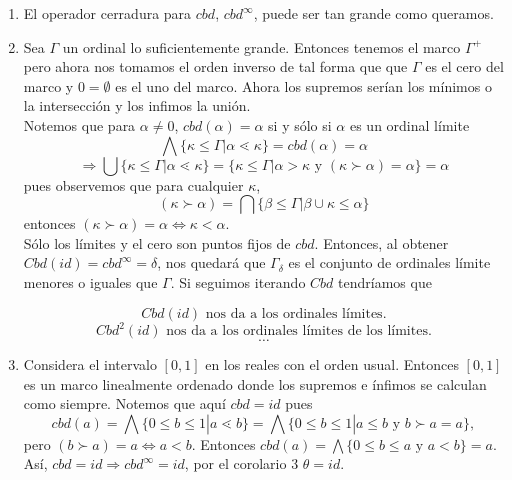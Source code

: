 \begin{example}
\begin{enumerate}
\item El operador cerradura para $cbd$, $cbd^\infty$, puede ser tan grande como queramos.

\item Sea $\Gamma$ un ordinal lo suficientemente grande. Entonces tenemos el marco $\Gamma^+$ pero ahora nos tomamos el orden inverso de tal forma que que $\Gamma$ es el cero del marco y $0=\emptyset$ es el uno del marco. Ahora los supremos serían los mínimos o la intersección y los infimos la unión.\\
Notemos que para $\alpha\neq 0$, $cbd(\alpha)=\alpha$ si y sólo si $\alpha$ es un ordinal límite 
$$\bigwedge\{\kappa\leq\Gamma|\alpha\lessdot \kappa\}=cbd(\alpha)=\alpha$$
$$\Rightarrow \bigcup\{\kappa\leq \Gamma|\alpha\lessdot \kappa\}=\{\kappa\leq \Gamma|\alpha>\kappa\mbox{  y  }(\kappa\succ \alpha)=\alpha\}=\alpha$$
pues observemos que para cualquier $\kappa$,
$$(\kappa\succ \alpha)=\bigcap\{\beta\leq \Gamma|\beta\cup\kappa\leq \alpha\}$$
entonces $(\kappa\succ \alpha)=\alpha\Leftrightarrow \kappa<\alpha$.\\
Sólo los límites y el cero son puntos fijos de $cbd$.
Entonces, al obtener $Cbd(id)=cbd^\infty=\delta$, nos quedará que $\Gamma_\delta$ es el conjunto de ordinales límite menores o iguales que $\Gamma$. Si seguimos iterando $Cbd$ tendríamos que 

\[Cbd(id)\mbox{  nos da a los ordinales límites}.\]
\[Cbd^2(id)\mbox{  nos da a los ordinales límites de los límites}.\]
 \[\ldots\]
 
\item Considera el intervalo $[0,1]$ en los reales con el orden usual. Entonces $[0,1]$ es un marco linealmente ordenado donde los supremos e ínfimos se calculan como siempre. Notemos que aquí $cbd=id$ pues 
\[cbd(a)=\bigwedge\{0\leq b\leq 1|a\lessdot b\}=\bigwedge\{0\leq b\leq 1|a\leq b\mbox{  y  }b\succ a=a\}, \]
pero $(b\succ a)=a\Leftrightarrow a<b$. Entonces $cbd(a)=\bigwedge\{0\leq b\leq a\mbox{  y  }a<b\}=a$. Así, $cbd=id\Rightarrow cbd^\infty=id$, por el corolario 3 $\theta=id$. 

\end{enumerate}
\end{example}


